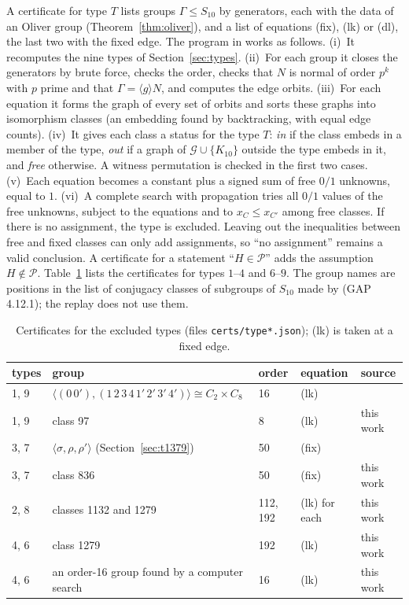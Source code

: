 \documentclass[11pt]{article}
\theoremstyle{plain}
\theoremstyle{definition}
\theoremstyle{remark}
\newcommand{\PP}{\mathcal P}
\newcommand{\file}[1]{\path{#1}}
\begin{document}
A certificate for type $T$ lists groups $\Gamma\le S_{10}$ by generators, each with the data of an Oliver group (Theorem~\ref{thm:oliver}), and a list of equations (fix), (lk) or (dl), the last two with the fixed edge.
The program in \file{replay/replay_cert.py} works as follows.
(i)~It recomputes the nine types of Section~\ref{sec:types}.
(ii)~For each group it closes the generators by brute force, checks the order, checks that $N$ is normal of order $p^k$ with $p$ prime and that $\Gamma=\langle g\rangle N$, and computes the edge orbits.
(iii)~For each equation it forms the graph of every set of orbits and sorts these graphs into isomorphism classes (an embedding found by backtracking, with equal edge counts).
(iv)~It gives each class a status for the type $T$: \emph{in} if the class embeds in a member of the type, \emph{out} if a graph of $\mathcal G\cup\{K_{10}\}$ outside the type embeds in it, and \emph{free} otherwise.
A witness permutation is checked in the first two cases.
(v)~Each equation becomes a constant plus a signed sum of free $0/1$ unknowns, equal to $1$.
(vi)~A complete search with propagation tries all $0/1$ values of the free unknowns, subject to the equations and to $x_C\le x_{C'}$ among free classes.
If there is no assignment, the type is excluded.
Leaving out the inequalities between free and fixed classes can only add assignments, so ``no assignment'' remains a valid conclusion.
A certificate for a statement ``$H\in\PP$'' adds the assumption $H\notin\PP$.
Table~\ref{tab:cert} lists the certificates for types $1$--$4$ and $6$--$9$.
The group names are positions in the list of conjugacy classes of subgroups of $S_{10}$ made by \file{gap/enum_subgroups.g} (GAP 4.12.1); the replay does not use them.

\begin{table}[t]
\centering
\begin{tabular}{lllll}
\toprule
types & group & order & equation & source\\
\midrule
1, 9 & $\langle(0\,0'),(1\,2\,3\,4\,1'\,2'\,3'\,4')\rangle\cong C_2\times C_8$ & 16 & (lk) & \cite{AB}\\
1, 9 & class 97 & 8 & (lk) & this work\\
3, 7 & $\langle\sigma,\rho,\rho'\rangle$ (Section~\ref{sec:t1379}) & 50 & (fix) & \cite{AB}\\
3, 7 & class 836 & 50 & (fix) & this work\\
2, 8 & classes 1132 and 1279 & 112, 192 & (lk) for each & this work\\
4, 6 & class 1279 & 192 & (lk) & this work\\
4, 6 & an order-16 group found by a computer search & 16 & (lk) & this work\\
\bottomrule
\end{tabular}
\caption{Certificates for the excluded types (files \texttt{certs/type*.json}); (lk) is taken at a fixed edge.}\label{tab:cert}
\end{table}
\end{document}
